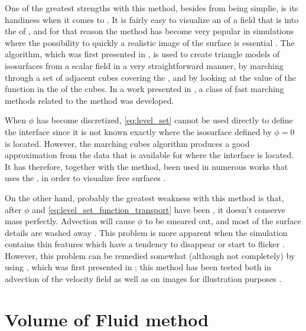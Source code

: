 One of the greatest strengths with this method, besides from being simplie, is its handiness when it comes to . It is fairly easy to visualize an \isosurface of a field that is \discretized into the \nodes of , and for that reason the \LS method has become very popular in \FVM simulations where the possibility to quickly \render a realistic image of the surface is essential \citep{Losasso2004,Chentanez2011}. The  algorithm, which was first presented in \citeyear{Lorensen1987} \citep{Lorensen1987}, is used to create triangle models of isosurfaces from a scalar field in a very straightforward manner, by marching through a set of adjacent cubes covering the , and by looking at the value of the function in the  of the cubes. In a work presented in \citeyear{Sethian1995} \citep{Sethian1995}, a class of fast marching methods related to the \LS method was developed.

When $\phi$ has become discretized, \eqref{eq:level_set} cannot be used directly to define the interface since it is not known exactly where the isosurface defined by $\phi = 0$ is located. However, the marching cubes algorithm produces a good approximation from the data that is available for where the interface is located. It has therefore, together with the \LS method, been used in numerous works that uses the \FVM, in order to visualize free surfaces \citep[e.g.][]{Losasso2004}.

On the other hand, probably the greatest weakness with this method is that, after $\phi$ and \eqref{eq:level_set_function_transport} have been \discretized, it doesn't conserve mass perfectly. Advection will cause $\phi$ to be smeared out, and most of the surface details are washed away \citep{Wojtan2009}. This problem is more apparent when the simulation contains thin features which have a tendency to disappear or start to flicker \citep{nthuerey2009}. However, this problem can be remedied somewhat (although not completely) by using \BFECC, which was first presented in \citeyear{Dupont2003} \citep{Dupont2003}; this method has been tested both in advection of the velocity field as well as on images for illustration purposes \citep{Kim2005}.

\section{Volume of Fluid method}

